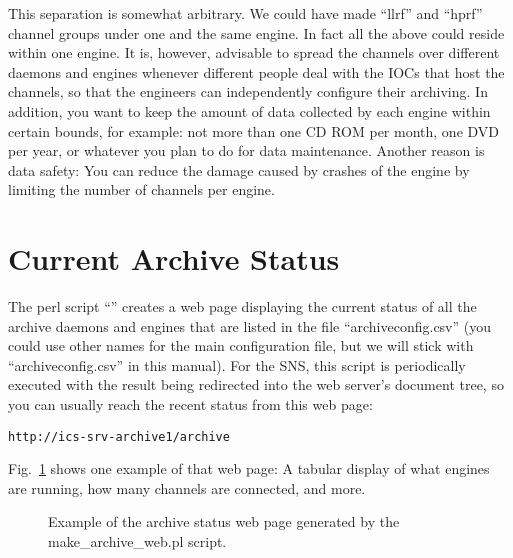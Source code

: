 This separation is somewhat arbitrary. We could have made ``llrf'' and
``hprf'' channel groups under one and the same engine. In fact all the above
could reside within one engine. It is, however, advisable to spread the channels
over different daemons and engines whenever different people deal with
the IOCs that host the channels, so that the engineers can
independently configure their archiving. 
In addition, you want to keep the amount of data collected by each
engine within certain bounds, for example: not more than one CD ROM
per month, one DVD per year, or whatever you plan to do for data
maintenance. Another reason is data safety: You can reduce the damage
caused by crashes of the engine by limiting the number of channels per engine.

\section{Current Archive Status} \label{sec:makearchweb}
The perl script ``'' creates a web page
displaying the current status of all the archive daemons and engines
that are listed in the file ``archiveconfig.csv''
(you could use other names for the main configuration file, but we
will stick with ``archiveconfig.csv'' in this manual).
For the SNS, this script is periodically executed with the result being
redirected into the web server's document tree, so you can usually
reach the recent status from this web page:
\begin{lstlisting}[frame=none,keywordstyle=\sffamily]
    http://ics-srv-archive1/archive
\end{lstlisting}
\noindent  Fig.~\ref{fig:archcfgstat} shows one example of that web
page: A tabular display of what engines are running, how many channels are
connected, and more.

\medskip

\begin{figure}[htb]
\begin{center}
\end{center}
\caption{\label{fig:archcfgstat}Example of the archive status web page
  generated by the make\_archive\_web.pl script.}
\end{figure}

